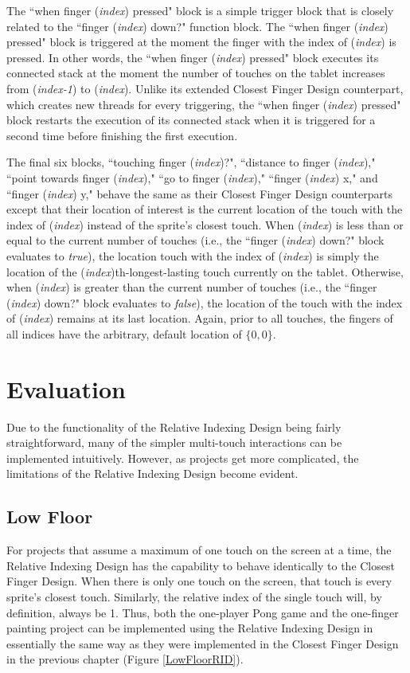 The ``when finger (\emph{index}) pressed" block is a simple trigger block that is closely related to the ``finger (\emph{index}) down?" function block. The ``when finger (\emph{index}) pressed" block is triggered at the moment the finger with the index of (\emph{index}) is pressed. In other words, the ``when finger (\emph{index}) pressed" block executes its connected stack at the moment the number of touches on the tablet increases from (\emph{index-1}) to (\emph{index}). Unlike its extended Closest Finger Design counterpart, which creates new threads for every triggering, the ``when finger (\emph{index}) pressed" block restarts the execution of its connected stack when it is triggered for a second time before finishing the first execution.

The final six blocks, ``touching finger (\emph{index})?", ``distance to finger (\emph{index})," ``point towards finger (\emph{index})," ``go to finger (\emph{index})," ``finger (\emph{index}) x," and ``finger (\emph{index}) y," behave the same as their Closest Finger Design counterparts except that their location of interest is the current location of the touch with the index of (\emph{index}) instead of the sprite's closest touch. When (\emph{index}) is less than or equal to the current number of touches (i.e., the ``finger (\emph{index}) down?" block evaluates to \emph{true}), the location touch with the index of (\emph{index}) is simply the location of the (\emph{index})th-longest-lasting touch currently on the tablet. Otherwise, when (\emph{index}) is greater than the current number of touches (i.e., the ``finger (\emph{index}) down?" block evaluates to \emph{false}), the location of the touch with the index of (\emph{index}) remains at its last location. Again, prior to all touches, the fingers of all indices have the arbitrary, default  location of $\{0,0\}$.

\section{Evaluation}

Due to the functionality of the Relative Indexing Design being fairly straightforward, many of the simpler multi-touch interactions can be implemented intuitively. However, as projects get more complicated, the limitations of the Relative Indexing Design become evident.

\subsection{Low Floor}
For projects that assume a maximum of one touch on the screen at a time, the  Relative Indexing Design has the capability to behave identically to the Closest Finger Design. When there is only one touch on the screen, that touch is every sprite's closest touch. Similarly, the relative index of the single touch will, by definition, always be 1. Thus, both the one-player Pong game and the one-finger painting project can be implemented using the Relative Indexing Design in essentially the same way as they were implemented in the Closest Finger Design in the previous chapter (Figure \ref{LowFloorRID}).

